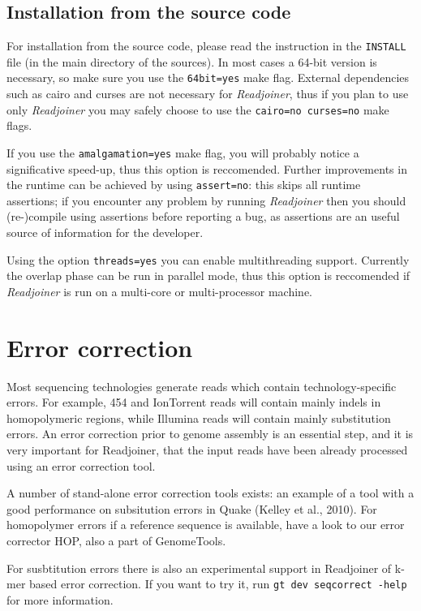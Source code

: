 \documentclass[12pt,titlepage]{article}
\newcommand{\Readjoiner}{\textit{Readjoiner}\xspace}
\begin{document}
\subsection{Installation from the source code}

For installation from the source code, please read the instruction in the
\texttt{INSTALL}
file (in the main directory of the sources). In most cases a 64-bit version
is necessary, so make sure you use the \texttt{64bit=yes} make flag.
External dependencies such as cairo and curses are not necessary for
\Readjoiner, thus if you plan to use only \Readjoiner you may safely choose
to use the \texttt{cairo=no curses=no} make flags.

If you use the \texttt{amalgamation=yes} make flag, you will probably notice
a significative speed-up, thus this option is reccomended. Further improvements
in the runtime can be achieved by using \texttt{assert=no}: this skips all
runtime assertions; if you encounter any problem by running \Readjoiner
then you should (re-)compile using assertions before reporting a bug,
as assertions are an useful source of information for the developer.

Using the option \texttt{threads=yes} you can enable multithreading support.
Currently the overlap phase can be run in parallel mode, thus this option is
reccomended if \Readjoiner is run on a multi-core or multi-processor
machine.

\section{Error correction}

Most sequencing technologies generate reads which contain technology-specific
errors. For example, 454 and IonTorrent reads will contain mainly indels in
homopolymeric regions, while Illumina reads will contain mainly substitution
errors. An error correction prior to genome assembly is an essential step,
and it is very important for Readjoiner, that the input reads have been already
processed using an error correction tool.

A number of stand-alone error correction tools exists: an example of a tool
with a good performance on subsitution errors in Quake (Kelley et al., 2010).
For homopolymer errors if a reference sequence is available, have
a look to our error corrector HOP, also a part of GenomeTools.

For susbtitution errors there is also an experimental support in Readjoiner
of k-mer based error correction. If you want to try it,
run \texttt{gt dev seqcorrect -help} for more information.
\end{document}
